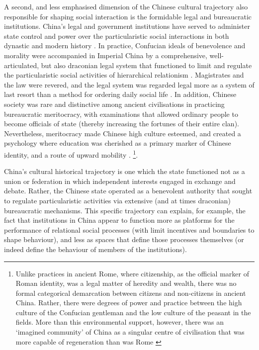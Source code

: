 \begin{CJK}{UTF8}{gbsn}
A second, and less emphasised dimension of the Chinese cultural trajectory also responsible for shaping social interaction is the formidable legal and bureaucratic institutions.  China's legal and government institutions have served to administer state control and power over the particularistic social interactions in both dynastic and modern history \citep[]{Liu2017}.  In practice, Confucian ideals of benevolence and morality were accompanied in Imperial China by a comprehensive, well-articulated, but also draconian legal system that functioned to limit and regulate the particularistic social activities of hierarchical relationism \citep{Fitzgerald1985}. Magistrates and the law were revered, and the legal system was regarded legal more as a system of last resort than a method for ordering daily social life \citep{Liu2009}.  In addition, Chinese society was rare and distinctive among ancient civilisations in practicing bureaucratic meritocracy, with examinations that allowed ordinary people to become officials of state (thereby increasing the fortunes of their entire clan).  Nevertheless, meritocracy made Chinese high culture esteemed, and created a psychology where education was cherished as a primary marker of Chinese identity, and a route of upward mobility \citep{Spence1990}. \footnote{Unlike practices in ancient Rome, where citizenship, as the official marker of Roman identity, was a legal matter of heredity and wealth, there was no formal categorical demarcation between citizens and non-citizens in ancient China.  Rather, there were degrees of power and practice between the high culture of the Confucian gentleman and the low culture of the peasant in the fields.  More than this environmental support, however, there was an ‘imagined community’ \citep{Anderson1991} of China as a singular centre of civilisation that was more capable of regeneration than was Rome \citep[see][]{Liu2014}}.

China's cultural historical trajectory is one which the state functioned not as a union or federation in which independent interests engaged in exchange and debate.  Rather, the Chinese state operated as a benevolent authority that sought to regulate particularistic activities via extensive (and at times draconian) bureaucratic mechanisms.  This specific trajectory can explain, for example, the fact that institutions in China appear to function more as platforms for the performance of relational social processes (with limit incentives and boundaries to shape behaviour), and less as spaces that define those processes themselves (or indeed define the behaviour of members of the institutions).


\end{CJK}
